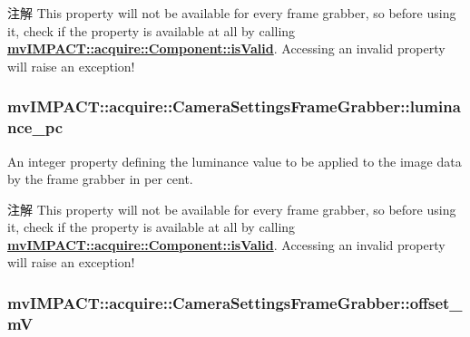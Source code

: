 \begin{DoxyNote}{注解}
This property will not be available for every frame grabber, so before using it, check if the property is available at all by calling {\bfseries \hyperlink{classmv_i_m_p_a_c_t_1_1acquire_1_1_component_ac51e55e7e046101f3c6119d84123abd5}{mv\+I\+M\+P\+A\+C\+T\+::acquire\+::\+Component\+::is\+Valid}}. Accessing an invalid property will raise an exception! 
\end{DoxyNote}
\hypertarget{classmv_i_m_p_a_c_t_1_1acquire_1_1_camera_settings_frame_grabber_aa00a4ef7269a28b048cdec911560600c}{
\subsubsection[{luminance\+\_\+pc}]{ mv\+I\+M\+P\+A\+C\+T\+::acquire\+::\+Camera\+Settings\+Frame\+Grabber\+::luminance\+\_\+pc}}\label{classmv_i_m_p_a_c_t_1_1acquire_1_1_camera_settings_frame_grabber_aa00a4ef7269a28b048cdec911560600c}


An integer property defining the luminance value to be applied to the image data by the frame grabber in per cent. 

\begin{DoxyNote}{注解}
This property will not be available for every frame grabber, so before using it, check if the property is available at all by calling {\bfseries \hyperlink{classmv_i_m_p_a_c_t_1_1acquire_1_1_component_ac51e55e7e046101f3c6119d84123abd5}{mv\+I\+M\+P\+A\+C\+T\+::acquire\+::\+Component\+::is\+Valid}}. Accessing an invalid property will raise an exception! 
\end{DoxyNote}
\hypertarget{classmv_i_m_p_a_c_t_1_1acquire_1_1_camera_settings_frame_grabber_a276705f4a208d2956d6aeb94f56247c4}{
\subsubsection[{offset\+\_\+m\+V}]{ mv\+I\+M\+P\+A\+C\+T\+::acquire\+::\+Camera\+Settings\+Frame\+Grabber\+::offset\+\_\+m\+V}}\label{classmv_i_m_p_a_c_t_1_1acquire_1_1_camera_settings_frame_grabber_a276705f4a208d2956d6aeb94f56247c4}


